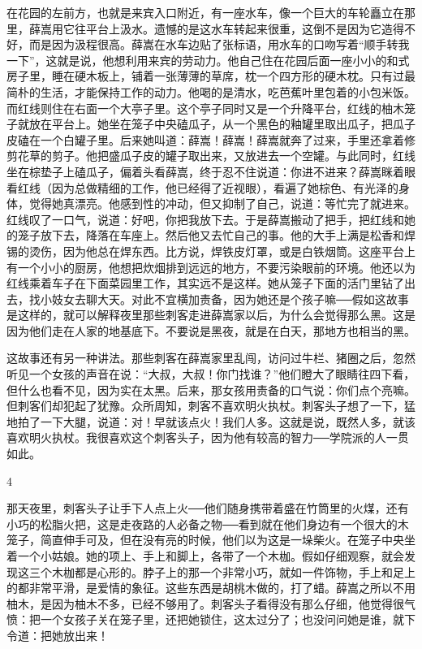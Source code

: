 在花园的左前方，也就是来宾入口附近，有一座水车，像一个巨大的车轮矗立在那里，薛嵩用它往平台上汲水。遗憾的是这水车转起来很重，这倒不是因为它造得不好，而是因为汲程很高。薛嵩在水车边贴了张标语，用水车的口吻写着“顺手转我一下”，这就是说，他想利用来宾的劳动力。他自己住在花园后面一座小小的和式房子里，睡在硬木板上，铺着一张薄薄的草席，枕一个四方形的硬木枕。只有过最简朴的生活，才能保持工作的动力。他喝的是清水，吃芭蕉叶里包着的小包米饭。而红线则住在右面一个大亭子里。这个亭子同时又是一个升降平台，红线的柚木笼子就放在平台上。她坐在笼子中央磕瓜子，从一个黑色的釉罐里取出瓜子，把瓜子皮磕在一个白罐子里。后来她叫道：薛嵩！薛嵩！薛嵩就奔了过来，手里还拿着修剪花草的剪子。他把盛瓜子皮的罐子取出来，又放进去一个空罐。与此同时，红线坐在棕垫子上磕瓜子，偏着头看薛嵩，终于忍不住说道：你进不进来？薛嵩眯着眼看红线（因为总做精细的工作，他已经得了近视眼），看遍了她棕色、有光泽的身体，觉得她真漂亮。他感到性的冲动，但又抑制了自己，说道：等忙完了就进来。红线叹了一口气，说道：好吧，你把我放下去。于是薛嵩搬动了把手，把红线和她的笼子放下去，降落在车座上。然后他又去忙自己的事。他的大手上满是松香和焊锡的烫伤，因为他总在焊东西。比方说，焊铁皮灯罩，或是白铁烟筒。这座平台上有一个小小的厨房，他想把炊烟排到远远的地方，不要污染眼前的环境。他还以为红线乘着车子在下面菜园里工作，其实远不是这样。她从笼子下面的活门里钻了出去，找小妓女去聊大天。对此不宜横加责备，因为她还是个孩子嘛──假如这故事是这样的，就可以解释夜里那些刺客走进薛嵩家以后，为什么会觉得那么黑。这是因为他们走在人家的地基底下。不要说是黑夜，就是在白天，那地方也相当的黑。 

这故事还有另一种讲法。那些刺客在薛嵩家里乱闯，访问过牛栏、猪圈之后，忽然听见一个女孩的声音在说：“大叔，大叔！你门找谁？”他们瞪大了眼睛往四下看，但什么也看不见，因为实在太黑。后来，那女孩用责备的口气说：你们点个亮嘛。但刺客们却犯起了犹豫。众所周知，刺客不喜欢明火执杖。刺客头子想了一下，猛地拍了一下大腿，说道：对！早就该点火！我们人多。这就是说，既然人多，就该喜欢明火执杖。我很喜欢这个刺客头子，因为他有较高的智力──学院派的人一贯如此。 

4 

那天夜里，刺客头子让手下人点上火──他们随身携带着盛在竹筒里的火煤，还有小巧的松脂火把，这是走夜路的人必备之物──看到就在他们身边有一个很大的木笼子，简直伸手可及，但在没有亮的时候，他们以为这是一垛柴火。在笼子中央坐着一个小姑娘。她的项上、手上和脚上，各带了一个木枷。假如仔细观察，就会发现这三个木枷都是心形的。脖子上的那一个非常小巧，就如一件饰物，手上和足上的都非常平滑，是爱情的象征。这些东西是胡桃木做的，打了蜡。薛嵩之所以不用柚木，是因为柚木不多，已经不够用了。刺客头子看得没有那么仔细，他觉得很气愤：把一个女孩子关在笼子里，还把她锁住，这太过分了；也没问问她是谁，就下令道：把她放出来！ 

